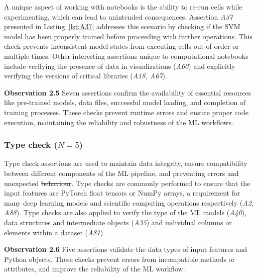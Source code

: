 \documentclass[smallextended]{svjour3}       %
\newcommand{\highlight}[1]{\begin{framed}%
  \noindent#1
\end{framed}}
\providecommand{\DIFadd}[1]{{\protect\color{blue}\uwave{#1}}} %
\providecommand{\DIFdel}[1]{{\protect\color{red}\sout{#1}}} %
\providecommand{\DIFaddbegin}{} %
\providecommand{\DIFaddend}{} %
\providecommand{\DIFdelbegin}{} %
\providecommand{\DIFdelend}{} %
\newcommand{\DIFscaledelfig}{0.5}
\newlength{\DIFdelgraphicswidth} %
\newlength{\DIFdelgraphicsheight} %
\newcommand{\DIFaddincludegraphics}[2][]{{\color{blue}\fbox{\DIFOincludegraphics[#1]{#2}}}} %
\newcommand{\DIFdelincludegraphics}[2][]{%
\sbox{\DIFdelgraphicsbox}{\DIFOincludegraphics[#1]{#2}}%
\settoboxwidth{\DIFdelgraphicswidth}{\DIFdelgraphicsbox} %
\settoboxtotalheight{\DIFdelgraphicsheight}{\DIFdelgraphicsbox} %
\scalebox{\DIFscaledelfig}{%
\parbox[b]{\DIFdelgraphicswidth}{\usebox{\DIFdelgraphicsbox}\\[-\baselineskip] \rule{\DIFdelgraphicswidth}{0em}}\llap{\resizebox{\DIFdelgraphicswidth}{\DIFdelgraphicsheight}{%
\setlength{\unitlength}{\DIFdelgraphicswidth}%
\begin{picture}(1,1)%
\thicklines\linethickness{2pt} %
{\color[rgb]{1,0,0}\put(0,0){\framebox(1,1){}}}%
{\color[rgb]{1,0,0}\put(0,0){\line( 1,1){1}}}%
{\color[rgb]{1,0,0}\put(0,1){\line(1,-1){1}}}%
\end{picture}%
}\hspace*{3pt}}} %
} %
\DeclareRobustCommand{\DIFaddbegin}{\DIFOaddbegin \let\includegraphics\DIFaddincludegraphics} %
\DeclareRobustCommand{\DIFaddend}{\DIFOaddend \let\includegraphics\DIFOincludegraphics} %
\DeclareRobustCommand{\DIFdelbegin}{\DIFOdelbegin \let\includegraphics\DIFdelincludegraphics} %
\DeclareRobustCommand{\DIFdelend}{\DIFOaddend \let\includegraphics\DIFOincludegraphics} %
\begin{document}
A unique aspect of working with notebooks is the ability to re-run cells while experimenting, which can lead to unintended consequences. Assertion \emph{A37} presented in Listing~\ref{lst:A37} addresses this scenario by checking if the SVM model has been properly trained before proceeding with further operations. This check prevents inconsistent model states from executing cells out of order or multiple times. Other interesting assertions unique to computational notebooks include verifying the presence of data in visualizations (\emph{A60}) and explicitly verifying the versions of critical libraries (\emph{A18, A67}).

\DIFdelbegin %
\DIFdelend \DIFaddbegin \highlight{\textbf{Observation 2.5} Seven assertions confirm the availability of essential resources like pre-trained models, data files, successful model loading, and completion of training processes. These checks prevent runtime errors and ensure proper code execution, maintaining the reliability and robustness of the ML workflows.}
\DIFaddend 

\subsubsection{Type check ($N = 5$)}

Type check assertions are used to maintain data integrity, ensure compatibility between different components of the ML pipeline, and preventing errors and unexpected \DIFdelbegin \DIFdel{behaviour}\DIFdelend \DIFaddbegin \DIFadd{behavior}\DIFaddend . Type checks are commonly performed to ensure that the input features are PyTorch float tensors or NumPy arrays, a requirement for many deep learning models and scientific computing operations respectively (\emph{A2, A88}). Type checks are also applied to verify the type of the ML models (\emph{A40}), data structures and intermediate objects (\emph{A35}) and individual columns or elements within a dataset (\emph{A81}).

\DIFdelbegin %
\DIFdelend \DIFaddbegin \highlight{\textbf{Observation 2.6} Five assertions validate the data types of input features and Python objects. These checks prevent errors from incompatible methods or attributes, and improve the reliability of the ML workflow.}
\DIFaddend 
\end{document}
